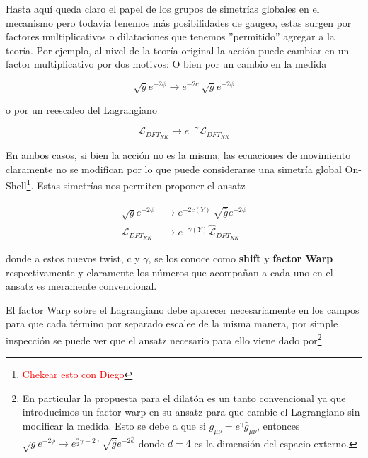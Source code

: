 \documentclass{article}
\numberwithin{equation}{section}
\begin{document}
Hasta aquí queda claro el papel de los grupos de simetrías globales en el mecanismo pero todavía tenemos más posibilidades de gaugeo, estas surgen por factores multiplicativos o dilataciones que tenemos ''permitido'' agregar a la teoría. Por ejemplo, al nivel de la teoría original la acción puede cambiar en un factor multiplicativo por dos motivos: O bien por un cambio en la medida

\begin{equation}
\sqrt{g}e^{-2\phi} \longrightarrow e^{-2c} \ \sqrt{g}e^{-2\phi}
\end{equation}

o por un reescaleo del Lagrangiano

\begin{equation}
\mathcal{L}_{DFT_{KK}} \longrightarrow e^{- \gamma} \mathcal{L}_{DFT_{KK}}
\end{equation}

En ambos casos, si bien la acción no es la misma, las ecuaciones de movimiento claramente no se modifican por lo que puede considerarse una simetría global On-Shell\footnote{\textcolor{red}{Chekear esto con Diego}}. Estas simetrías nos permiten proponer el ansatz

\begin{equation}\label{c y gamma}
\begin{aligned}
\sqrt{g}e^{-2\phi} &\longrightarrow e^{-2c(Y)} \ \sqrt{\hat{g}}e^{-2\hat{\phi}}\\
\mathcal{L}_{DFT_{KK}} &\longrightarrow e^{- \gamma(Y)} \hat{\mathcal{L}}_{DFT_{KK}}
\end{aligned}
\end{equation}

donde a estos nuevos twist, c y $ \gamma $, se los conoce como \textbf{shift} y \textbf{factor Warp} respectivamente y claramente los números que acompañan a cada uno en el ansatz es meramente convencional.

El factor Warp sobre el Lagrangiano debe aparecer necesariamente en los campos para que cada término por separado escalee de la misma manera, por simple inspección se puede ver que el ansatz necesario para ello viene dado por\footnote{ En particular la propuesta para el dilatón es un tanto convencional ya que introducimos un factor warp en su ansatz para que cambie el Lagrangiano sin modificar la medida. Esto se debe a que si $ g_{\mu \nu}= e^{\gamma}\hat{g}_{\mu \nu} $, entonces  $ \sqrt{g}e^{-2\phi} \longrightarrow e^{ \frac{d}{2} \gamma - 2\gamma} \ \sqrt{\hat{g}}e^{-2\hat{\phi}} $ donde $ d=4 $ es la dimensión del espacio externo.}
\end{document}
